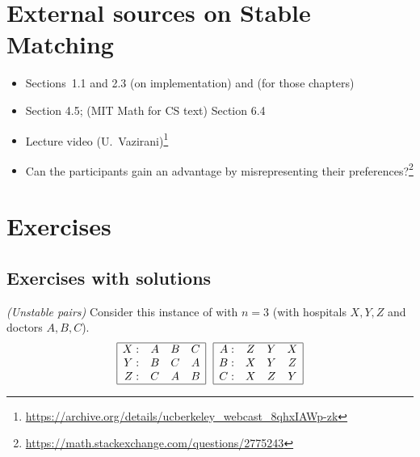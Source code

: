 \documentclass[11pt]{article}
\begin{document}
\section{External sources on Stable Matching}\label{matching: sec: sources}
\small
\begin{itemize}

\item \KT Sections~1.1 and 2.3 (on implementation) and \KWSlides (for those chapters)

\item
  \JEGreedy Section 4.5;
  \LLM (MIT Math for CS text) Section 6.4

\item Lecture video (U.~Vazirani)\footnote{\url{https://archive.org/details/ucberkeley_webcast_8qhxIAWp-zk}} 

\item Can the participants gain an advantage by misrepresenting their preferences?\footnote
  {\url{https://math.stackexchange.com/questions/2775243}}

\end{itemize}



\section{Exercises}

\subsection{Exercises with solutions}\label{matching: sec: exercises with solutions}

\exercise\label{matching: prob: instance}\emph{(Unstable pairs)}
Consider this instance of  with $n=3$ (with hospitals $X, Y, Z$ and doctors $A, B, C$).
\[
\begin{array}{|rccc|} \hline
  X: & A & B & C\\
  Y: & B & C & A\\
  Z: & C & A & B \\ \hline
\end{array}
~~{}
\begin{array}{|rccc|}\hline
  A: & Z & Y & X\\
  B: & X & Y & Z\\
  C: & X & Z & Y \\\hline
\end{array}
\]
\end{document}
